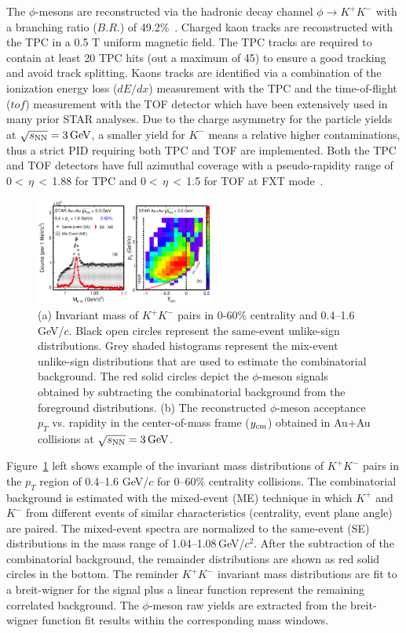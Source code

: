 \documentclass[%
 reprint,	
showpacs,
 amsmath,amssymb,
 aps,
 prc,
]{revtex4-1}
\begin{document}
The $\phi$-mesons are reconstructed via the hadronic decay channel $\phi\rightarrow K^+K^-$ with a branching ratio ($B.R.$) of 49.2\%~\cite{pdg}. Charged kaon tracks are reconstructed with the TPC in a 0.5 T uniform magnetic field. The TPC tracks are required to contain at least 20 TPC hits (out a maximum of 45) to ensure a good tracking and avoid track splitting. Kaons tracks are identified via a combination of the ionization energy loss ($dE/dx$) measurement with the TPC and the time-of-flight ($tof$) measurement with the TOF detector which have been extensively used in many prior STAR analyses. Due to the charge asymmetry for the particle yields at ${\sqrt{s_{\rm NN}} = \rm{3\,GeV}}$, a smaller yield for $K^-$ means a relative higher contaminations, thus a strict PID requiring both TPC and TOF are implemented. Both the TPC and TOF detectors have full azimuthal coverage with a pseudo-rapidity range of 0$<$\,$\eta$\,$<$\,1.88 for TPC and 0$<$\,$\eta$\,$<$\,1.5 for TOF at FXT mode~\cite{TPC,TOF}.



\begin{figure}
\centering
\includegraphics[width=0.52\textwidth]{fig/fig1_signal.eps}
  \caption{(a) Invariant mass of $K^+K^-$ pairs in 0-60\% centrality and 0.4--1.6\,GeV/$c$. Black open circles represent the same-event unlike-sign distributions. Grey shaded histograms represent the mix-event unlike-sign distributions that are used to estimate the combinatorial background. The red solid circles depict the $\phi$-meson signals obtained by subtracting the combinatorial background from the foreground distributions. (b) The reconstructed $\phi$-meson acceptance $p_T$ vs. rapidity in the center-of-mass frame ($y_{\rm cm}$) obtained in Au+Au collisions at ${\sqrt{s_{\rm NN}} = \rm{3\,GeV}}$.}
\label{fig:phiSignal} 
\end{figure}


Figure~\ref{fig:phiSignal} left shows example of the invariant mass distributions of $K^+K^-$ pairs in the $p_{T}$ region of 0.4--1.6 GeV/$c$ for 0--60\% centrality collisions. The combinatorial background is estimated with the mixed-event (ME) technique in which $K^+$ and $K^-$ from different events of similar characteristics (centrality, event plane angle) are paired. The mixed-event spectra are normalized to the same-event (SE) distributions in the mass range of 1.04--1.08\,GeV/$c^2$. After the subtraction of the combinatorial background, the remainder distributions are shown as red solid circles in the bottom. The reminder $K^+K^-$ invariant mass distributions are fit to a breit-wigner for the signal plus a linear function represent the remaining correlated background. The $\phi$-meson raw yields are extracted from the breit-wigner function fit results within the corresponding mass windows.
\end{document}
